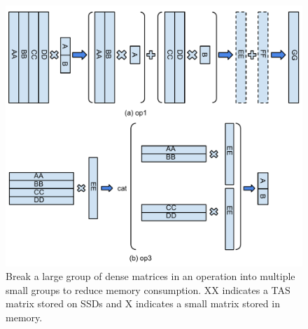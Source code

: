 \begin{figure}
\centering
\includegraphics[scale=0.4]{./mat_group.pdf}
\vspace{-5pt}
\caption{Break a large group of dense matrices in an operation into multiple
small groups to reduce memory consumption. XX indicates a TAS matrix
stored on SSDs and X indicates a small matrix stored in memory.}
\vspace{-5pt}
\label{fig:mat_group}
\end{figure}


